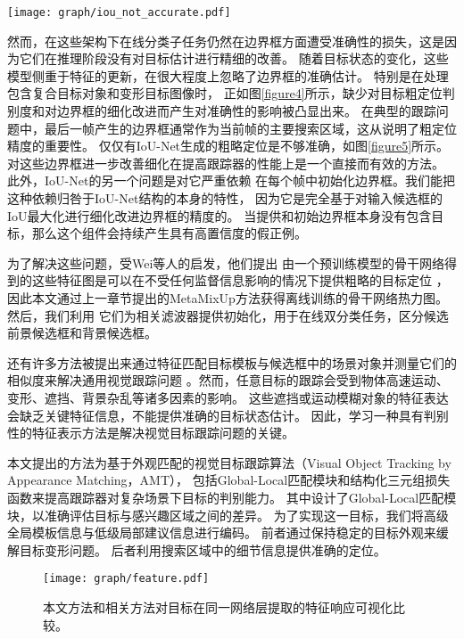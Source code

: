 \documentclass[promaster]{thesis-uestc}
\begin{document}
\begin{figure*}[htp!]
	\centering  
	\texttt{[image: graph/iou\_not\_accurate.pdf]}
    \caption{IoU Net生成的粗定位不准确，产生高置信度的预测框。}
	\label{figure5}
\end{figure*}

然而，在这些架构下在线分类子任务仍然在边界框方面遭受准确性的损失，这是因为它们在推理阶段没有对目标估计进行精细的改善。
随着目标状态的变化，这些模型侧重于特征的更新，在很大程度上忽略了边界框的准确估计。
特别是在处理包含复合目标对象和变形目标图像时，
正如图\ref{figure4}所示，缺少对目标粗定位判别度和对边界框的细化改进而产生对准确性的影响被凸显出来。
在典型的跟踪问题中，最后一帧产生的边界框通常作为当前帧的主要搜索区域，这从说明了粗定位精度的重要性。
仅仅有IoU-Net生成的粗略定位是不够准确，如图\ref{figure5}所示。
对这些边界框进一步改善细化在提高跟踪器的性能上是一个直接而有效的方法。
此外，IoU-Net的另一个问题是对它严重依赖
在每个帧中初始化边界框。我们能把这种依赖归咎于IoU-Net结构的本身的特性，
因为它是完全基于对输入候选框的IoU最大化进行细化改进边界框的精度的。
当提供和初始边界框本身没有包含目标，那么这个组件会持续产生具有高置信度的假正例。


为了解决这些问题，受Wei等人\cite{wei2017selective}的启发，他们提出
由一个预训练模型的骨干网络得到的这些特征图是可以在不受任何监督信息影响的情况下提供粗略的目标定位
，因此本文通过上一章节提出的MetaMixUp方法获得离线训练的骨干网络热力图。然后，我们利用
它们为相关滤波器提供初始化，用于在线双分类任务，区分候选前景候选框和背景候选框。

还有许多方法\cite{siamfc}\cite{wang2018learning}\cite{eco}被提出来通过特征匹配目标模板与候选框中的场景对象并测量它们的相似度来解决通用视觉跟踪问题
。然而，任意目标的跟踪会受到物体高速运动、变形、遮挡、背景杂乱等诸多因素的影响。
这些遮挡或运动模糊对象的特征表达会缺乏关键特征信息，不能提供准确的目标状态估计。
因此，学习一种具有判别性的特征表示方法是解决视觉目标跟踪问题的关键。

本文提出的方法为基于外观匹配的视觉目标跟踪算法（Visual Object Tracking by Appearance Matching，AMT），
包括Global-Local匹配模块和结构化三元组损失函数来提高跟踪器对复杂场景下目标的判别能力。
其中设计了Global-Local匹配模块，以准确评估目标与感兴趣区域之间的差异。
为了实现这一目标，我们将高级全局模板信息与低级局部建议信息进行编码。
前者通过保持稳定的目标外观来缓解目标变形问题。
后者利用搜索区域中的细节信息提供准确的定位。

\begin{figure}[htp]
    \begin{center}
    \texttt{[image: graph/feature.pdf]}
    \end{center}
       \caption{本文方法和相关方法对目标在同一网络层提取的特征响应可视化比较。}
    \label{feature}
\end{figure}
\end{document}
